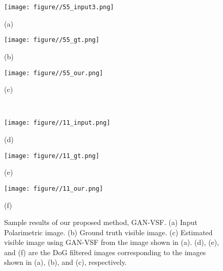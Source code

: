 \documentclass[10pt,twocolumn,letterpaper]{article}
\begin{document}
\begin{figure}[t]
	\centering
		\begin{minipage}{.15\textwidth}
			\centering
			\texttt{[image: figure//55\_input3.png]}
			\captionsetup{labelformat=empty}
			\captionsetup{justification=centering}
			\caption*{(a)}
	\end{minipage}
	\begin{minipage}{.15\textwidth}
		\centering
		\texttt{[image: figure//55\_gt.png]}
		\captionsetup{labelformat=empty}
		\captionsetup{justification=centering}
		\caption*{(b)}
	\end{minipage}
	\begin{minipage}{.15\textwidth}
		\centering
		\texttt{[image: figure//55\_our.png]}
		\captionsetup{labelformat=empty}
		\captionsetup{justification=centering}
    	\caption*{(c)}
	\end{minipage}\\
	\begin{minipage}{.15\textwidth}
			\centering
			\texttt{[image: figure//11\_input.png]}
			\captionsetup{labelformat=empty}
			\captionsetup{justification=centering}
			\caption*{(d)}
	\end{minipage}
	\begin{minipage}{.15\textwidth}
		\centering
		\texttt{[image: figure//11\_gt.png]}
		\captionsetup{labelformat=empty}
		\captionsetup{justification=centering}
		\caption*{(e)}
	\end{minipage}
	\begin{minipage}{.15\textwidth}
		\centering
		\texttt{[image: figure//11\_our.png]}
		\captionsetup{labelformat=empty}
		\captionsetup{justification=centering}
    	\caption*{(f)}
	\end{minipage}	
	\vskip -8pt
	\caption{Sample results of our proposed method, GAN-VSF. (a) Input Polarimetric image.  (b) Ground truth visible image.  (c)  Estimated visible image using GAN-VSF from the image shown in (a).  (d), (e), and (f) are the DoG filtered images corresponding to the images shown in (a), (b), and (c), respectively.}  \label{fig:over}
\end{figure}
\end{document}
